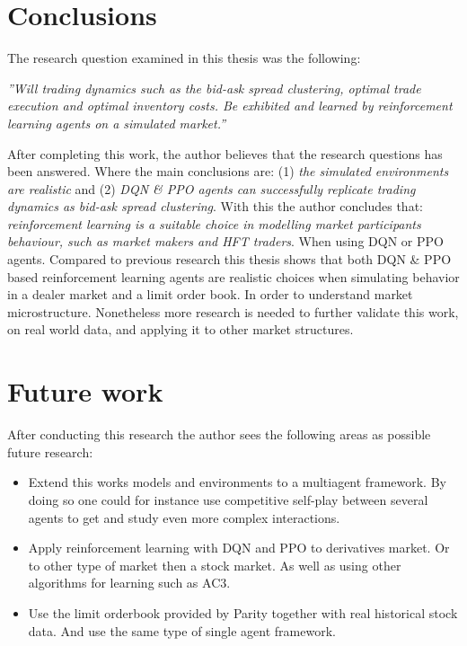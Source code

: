 \documentclass{kththesis}
\theoremstyle{definition}
\begin{document}
\newpage

\section{Conclusions}
The research question examined in this thesis was the following:
\begin{displayquote}
\it{''Will trading dynamics such as the bid-ask spread clustering, optimal trade execution and optimal inventory costs. Be exhibited and learned by reinforcement learning agents on a simulated market.''}
\end{displayquote}
After completing this work, the author believes that the research questions has been answered. Where the main conclusions are: (1) \textit{the simulated environments are realistic} and (2) \textit{DQN \& PPO agents can successfully replicate trading dynamics as bid-ask spread clustering}. With this the author concludes that: \textit{reinforcement learning is a suitable choice in modelling market participants behaviour, such as market makers and HFT traders}. When using DQN or PPO agents.
\newline
\newline
Compared to previous research this thesis shows that both DQN \& PPO based reinforcement learning agents are realistic choices when simulating behavior in a dealer market and a limit order book. In order to understand market microstructure. Nonetheless more research is needed to further validate this work, on real world data, and applying it to other market structures.

\section{Future work}
After conducting this research the author sees the following areas as possible future research:

\begin{itemize}
    \item Extend this works models and environments to a multiagent framework. By doing so one could for instance use competitive self-play between several agents to get and study even more complex interactions.
    
    \item Apply reinforcement learning with DQN and PPO to derivatives market. Or to other type of market then a stock market. As well as using other algorithms for learning such as AC3.
    
    \item Use the limit orderbook provided by Parity together with real historical stock data. And use the same type of single agent framework.
    
\end{itemize}
\end{document}
